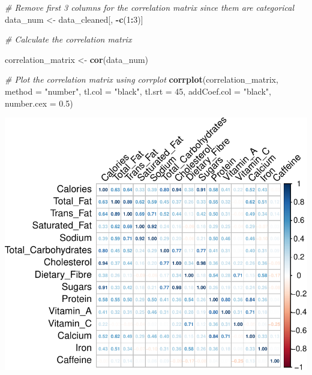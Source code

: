 \documentclass[
]{article}
\newenvironment{Shaded}{\begin{snugshade}}{\end{snugshade}}
\newcommand{\AttributeTok}[1]{\textcolor[rgb]{0.13,0.29,0.53}{#1}}
\newcommand{\CommentTok}[1]{\textcolor[rgb]{0.56,0.35,0.01}{\textit{#1}}}
\newcommand{\DecValTok}[1]{\textcolor[rgb]{0.00,0.00,0.81}{#1}}
\newcommand{\FloatTok}[1]{\textcolor[rgb]{0.00,0.00,0.81}{#1}}
\newcommand{\FunctionTok}[1]{\textcolor[rgb]{0.13,0.29,0.53}{\textbf{#1}}}
\newcommand{\NormalTok}[1]{#1}
\newcommand{\OtherTok}[1]{\textcolor[rgb]{0.56,0.35,0.01}{#1}}
\newcommand{\SpecialCharTok}[1]{\textcolor[rgb]{0.81,0.36,0.00}{\textbf{#1}}}
\newcommand{\StringTok}[1]{\textcolor[rgb]{0.31,0.60,0.02}{#1}}
\begin{document}
\begin{Shaded}
\begin{Highlighting}[]
\CommentTok{\# Remove first 3 columns for the correlation matrix since them are categorical}
\NormalTok{data\_num }\OtherTok{\textless{}{-}}\NormalTok{ data\_cleaned[, }\SpecialCharTok{{-}}\FunctionTok{c}\NormalTok{(}\DecValTok{1}\SpecialCharTok{:}\DecValTok{3}\NormalTok{)]}

\CommentTok{\# Calculate the correlation matrix}

\NormalTok{correlation\_matrix }\OtherTok{\textless{}{-}} \FunctionTok{cor}\NormalTok{(data\_num)}

\CommentTok{\# Plot the correlation matrix using corrplot}
\FunctionTok{corrplot}\NormalTok{(correlation\_matrix, }\AttributeTok{method =} \StringTok{"number"}\NormalTok{, }\AttributeTok{tl.col =} \StringTok{"black"}\NormalTok{, }
         \AttributeTok{tl.srt =} \DecValTok{45}\NormalTok{, }\AttributeTok{addCoef.col =} \StringTok{"black"}\NormalTok{, }\AttributeTok{number.cex =} \FloatTok{0.5}\NormalTok{)}
\end{Highlighting}
\end{Shaded}

\begin{center}\includegraphics{Statistical_Learning_Final_Report_files/figure-latex/correlation_analysis-1} \end{center}
\end{document}
